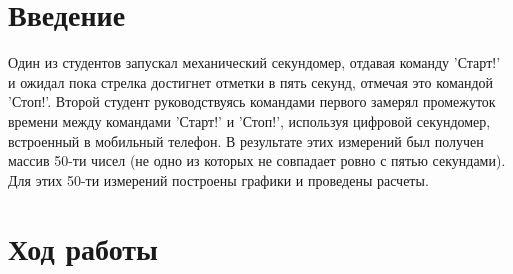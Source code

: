 \documentclass[11pt]{article}
\begin{document}
\section{Введение}
Один из студентов
запускал механический секундомер, отдавая команду 'Старт!'  и ожидал пока стрелка достигнет отметки в пять секунд, отмечая это командой 'Стоп!'. Второй студент
руководствуясь командами первого замерял промежуток времени между командами 'Старт!' и 'Стоп!', используя цифровой секундомер, встроенный в мобильный телефон.
В результате этих измерений был получен массив 50-ти чисел (не одно из которых не совпадает ровно с пятью секундами). Для этих 50-ти измерений построены графики и проведены расчеты.\\
\section{Ход работы}
\large
\end{document}
